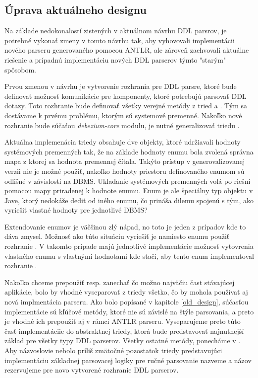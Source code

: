 \subsection{Úprava aktuálneho designu}
Na základe nedokonalostí zistených v aktuálnom návrhu DDL parsrov, je potrebné vykonať zmeny v tomto návrhu tak, aby vyhovovali implementácii nového parseru generovaného pomocou ANTLR, ale zároveň zachvovali aktuálne riešenie a prípadnú implementáciu nových DDL parserov týmto "starým"{ }spôsobom.

Prvou zmenou v návrhu je vytvorenie rozhrania pre DDL parsre, ktoré bude definovať možnosť komunikácie pre komponenty, ktoré potrebujú parsovať DDL dotazy. Toto rozhranie bude definovať všetky verejné metódy z tried  a . Tým sa dostávame k prvému problému, ktorým sú systemové premenné. Nakoľko nové rozhranie bude súčaťou \textit{debezium-core} modulu, je nutné generalizovať triedu . 

Aktuálna implemenácia triedy  obsahuje dve  objekty, ktoré udržiavali hodnoty systémových premenných tak, že na základe hodnoty enumu  bola zvolená správna mapa z ktorej sa hodnota premennej čítala. Takýto prístup v generovalizovanej verzii nie je možné použiť, nakoľko hodnoty priestoru definovaného enumom  sú odlišné v závislosti na DBMS. Ukladanie systémových premenných volá po riešní pomocou mapy priradenej k hodnote  enumu. Enum je ale špeciálny typ objektu v Jave, ktorý nedokáže dediť od iného enumu, čo prináša dilemu spojenú s tým, ako vyriešiť vlastné hodnoty  pre jednotlivé DBMS? 

Extendovanie enumov je väčšinou zlý nápad, no toto je jeden z prípadov kde to dáva zmysel. Možnosť ako túto situáciu vyriešiť je namiesto enumu  použiť rozhranie . V takomto prípade majú jednotlivé implementácie možnosť vytovrenia vlastného enumu s vlastnými hodnotami kde stačí, aby tento enum implementoval rozhranie . \cite{effective_java}

Nakoľko chceme prepoužiť resp. zanechať čo možno najväčiu čast stávajúcej aplikácie, bolo by vhodné vyseparovať z triedy  všetko, čo by mohola používať aj nová implmentácia parseru. Ako bolo popísané v kapitole \ref{old_design}, súčasťou implementácie  sú kľúčové metódy, ktoré nie sú závislé na štýle parsovania, a preto je vhodné ich prepoužiť aj v rámci ANTLR parseru. Vyseparujeme preto túto časť implementáciie do abstraktnej triedy, ktorá bude predstavovať najnutnejší základ pre všetky typy DDL parserov. Všetky ostatné metódy, ponecháme v . Aby názvoslovie nebolo príliš zmätočné pozostatok triedy  predstavujúci implementáciu základnej parsovacej logiky pre ručné parsovanie nazveme  a názov  rezervujeme pre novo vytvorené rozhranie DDL parserov.

